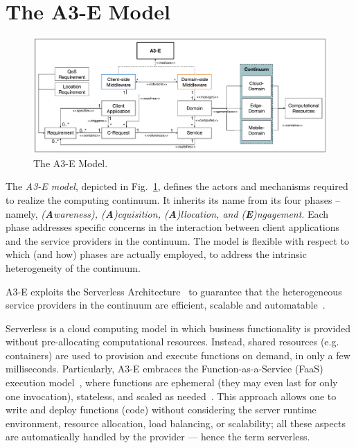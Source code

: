 \section{The A3-E Model}\label{sec:proposal}

\begin{figure}[tbp]
	\includegraphics[width=1\textwidth]{figs/A3-E-model.pdf}
	\caption{The A3-E Model.}
	\label{fig:A3-E-model}
\end{figure}

The \textit{A3-E model}, depicted in Fig.~\ref{fig:A3-E-model}, defines the actors and mechanisms required to realize the computing continuum. It inherits its name from its four phases -- namely, \textit{(\textbf{A}wareness), (\textbf{A})cquisition, (\textbf{A})llocation, and (\textbf{E})ngagement}. Each phase addresses specific concerns in the interaction between client applications and the service providers in the continuum. The model is flexible with respect to which (and how) phases are actually employed, to address the intrinsic heterogeneity of the continuum. 

A3-E exploits the Serverless Architecture~\cite{baldini2017serverless} to guarantee that the heterogeneous service providers in the continuum are efficient, scalable and automatable~\cite{GarrigaMendonca2017,Hendrickson:2016}. 

Serverless is a cloud computing model in which business functionality is provided without pre-allocating computational resources. Instead, shared resources (e.g. containers) are used to provision and execute functions on demand, in only a few milliseconds. Particularly, A3-E embraces the Function-as-a-Service (FaaS) execution model~\cite{MateosFaaster17}, where functions are ephemeral (they may even last for only one invocation), stateless, and scaled as needed~\cite{Roberts:2016}. This approach allows one to write and deploy functions (code) without considering the server runtime environment, resource allocation, load balancing, or scalability; all these aspects are automatically handled by the provider --- hence the term serverless.

